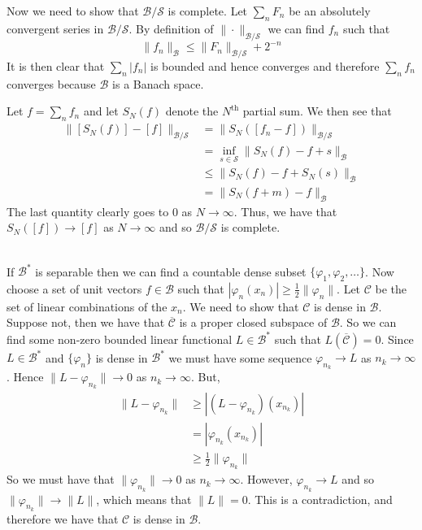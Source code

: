 \documentclass{article}
\newcommand{\problem}[1]{\noindent{\textbf{Problem #1}}\\}
\newcommand{\norm}[1]{\|#1\|}
\begin{document}
Now we need to show that $\mathcal{B}/\mathcal{S}$ is complete. Let $\sum_n F_n$ be an absolutely convergent series in $\mathcal{B}/\mathcal{S}$. By definition of $\norm{\cdot}_{\mathcal{B}/\mathcal{S}}$ we can find $f_n$ such that 
\[
\norm{f_n}_{\mathcal{B}} \leq \norm{F_n}_{\mathcal{B}/\mathcal{S}} + 2^{-n}
\]
It is then clear that $\sum_n |f_n|$ is bounded and hence converges and therefore $\sum_n f_n$ converges because $\mathcal{B}$ is a Banach space. 

Let $f = \sum_n f_n$ and let $S_N(f)$ denote the $N^{\text{th}}$ partial sum. We then see that
\begin{align*}
\norm{[S_N(f)] - [f]}_{\mathcal{B}/\mathcal{S}} &= \norm{S_N([f_n - f])}_{\mathcal{B}/\mathcal{S}} \\
&= \inf_{s \in \mathcal{S}}\norm{S_N(f) - f + s}_{\mathcal{B}} \\
&\leq \norm{S_N(f) - f + S_N(s)}_{\mathcal{B}} \\
&= \norm{S_N(f + m) - f}_{\mathcal{B}}
\end{align*}
The last quantity clearly goes to 0 as $N \to \infty$. Thus, we have that $S_N([f]) \to [f]$ as $N \to \infty$ and so $\mathcal{B}/\mathcal{S}$ is complete. 
 
\problem{1.8.32} If $\mathcal{B}^*$ is separable then we can find a countable dense subset $\{\varphi_1, \varphi_2,\ldots\}$. Now choose a set of unit vectors $f \in \mathcal{B}$ such that $|\varphi_n(x_n)| \geq \frac{1}{2} \norm{\varphi_n}$. Let $\mathcal{C}$ be the set of linear combinations of the $x_n$. We need to show that $\mathcal{C}$ is dense in $\mathcal{B}$. Suppose not, then we have that $\overline{\mathcal{C}}$ is a proper closed subspace of $\mathcal{B}$. So we can find some non-zero bounded linear functional $L \in \mathcal{B}^*$ such that $L(\overline{\mathcal{C}}) = 0$. Since $L \in \mathcal{B}^*$ and $\{\varphi_n\}$ is dense in $\mathcal{B}^*$ we must have some sequence $\varphi_{n_k} \to L$ as $n_k \to \infty$. Hence $\norm{L - \varphi_{n_k}} \to 0$ as $n_k \to \infty$. But,
\begin{align*}
\norm{L - \varphi_{n_k}} &\geq |(L - \varphi_{n_k})(x_{n_k})| \\
&= |\varphi_{n_k}(x_{n_k})| \\
&\geq \frac{1}{2}\norm{\varphi_{n_k}}
\end{align*}
So we must have that $\norm{\varphi_{n_k}} \to 0$ as $n_k \to \infty$. However, $\varphi_{n_k} \to L$ and so $\norm{\varphi_{n_k}} \to \norm{L}$, which means that $\norm{L} = 0$. This is a contradiction, and therefore we have that $\mathcal{C}$ is dense in $\mathcal{B}$. 
\end{document}
